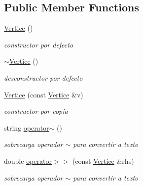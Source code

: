 \subsection*{Public Member Functions}
\begin{DoxyCompactItemize}
\item 
\mbox{\label{class_vertice_a9dd7cf987cddf248b9d4e3d31bf8822b}} 
\hyperlink{class_vertice_a9dd7cf987cddf248b9d4e3d31bf8822b}{Vertice} ()
\begin{DoxyCompactList}\small\item\em constructor por defecto \end{DoxyCompactList}\item 
\mbox{\label{class_vertice_ae231694dc3ff35959b5b20b879b4678a}} 
\hyperlink{class_vertice_ae231694dc3ff35959b5b20b879b4678a}{$\sim$\+Vertice} ()
\begin{DoxyCompactList}\small\item\em desconstructor por defecto \end{DoxyCompactList}\item 
\hyperlink{class_vertice_a8d8f3610b706a9e5d50e1138d9abea90}{Vertice} (const \hyperlink{class_vertice}{Vertice} \&v)
\begin{DoxyCompactList}\small\item\em constructor por copia \end{DoxyCompactList}\item 
\mbox{\label{class_vertice_a3c83f2d25882d03116afbc39906bbf31}} 
string \hyperlink{class_vertice_a3c83f2d25882d03116afbc39906bbf31}{operator$\sim$} ()
\begin{DoxyCompactList}\small\item\em sobrecarga operador $\sim$ para convertir a texto \end{DoxyCompactList}\item 
\mbox{\label{class_vertice_a8bf2ff926bc43cba6342d9f57f930708}} 
double \hyperlink{class_vertice_a8bf2ff926bc43cba6342d9f57f930708}{operator$>$$>$} (const \hyperlink{class_vertice}{Vertice} \&rhs)
\begin{DoxyCompactList}\small\item\em sobrecarga operador $\sim$ para convertir a texto \end{DoxyCompactList}\end{DoxyCompactItemize}
